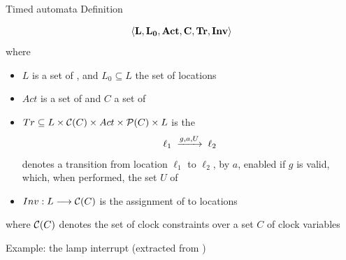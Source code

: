 \documentclass[aspectratio=169]{beamer}
\begin{document}
\begin{slide}{Timed automata Definition}
\small

\vspace*{-1mm}
\begin{block}{}
\begin{equation*}
\mathbf{\langle L, L_0, Act, C, Tr, Inv \rangle}
\end{equation*}
\vspace*{-1mm}
where
\vspace*{-1mm}
\begin{itemize}
\item $L$ is a set of , and $L_0 \subseteq L$ the set of  locations
\item $Act$ is a set of  and $C$ a set of 
\item $Tr \subseteq L \times \mathcal{C}(C) \times Act \times {\cal P}(C) \times L$ is the 
\vspace*{-1mm}
\begin{equation*}
\ell_1\; \xrightarrow{g,a,U}\;  \ell_2
\end{equation*}
\vspace*{-1mm}
denotes a transition from location $\ell_1$ to $\ell_2$,  by $a$, enabled if  $g$
is valid, which, when performed,  the set $U$ of 
\item $Inv: L \longrightarrow \mathcal{C}(C)$ is the assignment of  to locations  
\end{itemize}
\vspace*{-1mm}
where $\mathcal{C}(C)$ denotes the  set of clock constraints over a set $C$ of clock variables
\end{block}
\end{slide}

\begin{slide}{Example: the lamp interrupt}
\small
(extracted from \uppaal)

\begin{figure}[htb]
  \centering
\end{figure}

\vspace*{-3mm}

\end{slide}
\end{document}
